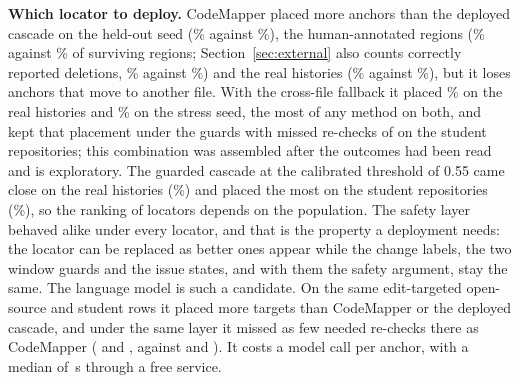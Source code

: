 \textbf{Which locator to deploy.} CodeMapper placed more anchors than the deployed cascade on the held-out seed (\wiFrCmQPlace\% against \wiFrDepPlace\%), the human-annotated regions (\wiHumCmQPlace\% against \wiHumDepPlace\% of surviving regions; Section~\ref{sec:external} also counts correctly reported deletions, \cExtHumCmAcc\% against \cExtHumDepAcc\%) and the real histories (\wiRealCmQPlace\% against \wiRealDepPlace\%), but it loses anchors that move to another file. With the cross-file fallback it placed \wiRealChQPlace\% on the real histories and \wiFrChQPlace\% on the stress seed, the most of any method on both, and kept that placement under the guards with \wiStuChGiMissK{} missed re-checks of \wiStuChGiMissN{} on the student repositories; this combination was assembled after the outcomes had been read and is exploratory. The guarded cascade at the calibrated threshold of 0.55 came close on the real histories (\wiRealCalGiPlace\%) and placed the most on the student repositories (\wiStuCalGiPlace\%), so the ranking of locators depends on the population. The safety layer behaved alike under every locator, and that is the property a deployment needs: the locator can be replaced as better ones appear while the change labels, the two window guards and the issue states, and with them the safety argument, stay the same. The language model is such a candidate. On the same edit-targeted open-source and student rows it placed more targets than CodeMapper or the deployed cascade, and under the same layer it missed as few needed re-checks there as CodeMapper (\wjPubGiMissK{} and \wjStuGiMissK{}, against \wjPubCmGiMissK{} and \wjStuCmGiMissK{}). It costs a model call per anchor, with a median of \wjPubMedianS{}\,s through a free service.
